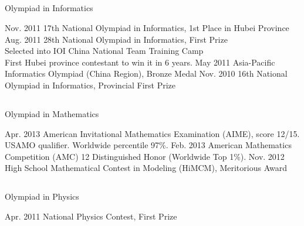 \documentclass[]{friggeri-cv} %
\begin{document}
\subsection{}{Olympiad in Informatics}
\begin{entrylist}
\centry
{Nov. 2011}
{17th National Olympiad in Informatics, 1st Place in Hubei Province}
\centry
{Aug. 2011}
{28th National Olympiad in Informatics, First Prize \\
Selected into IOI China National Team Training Camp \\
First Hubei province contestant to win it in 6 years. }
\centry
{May 2011}
{Asia-Pacific Informatics Olympiad (China Region), Bronze Medal}
\centry
{Nov. 2010}
{16th National Olympiad in Informatics, Provincial First Prize}
\end{entrylist}
\subsection{}{Olympiad in Mathematics}
\begin{entrylist}
\centry
{Apr. 2013}
{American Invitational Mathematics Examination (AIME), score 12/15. USAMO qualifier. Worldwide percentile 97\%. }
\centry
{Feb. 2013}
{American Mathematics Competition (AMC) 12 Distinguished Honor (Worldwide Top 1\%). }
\centry
{Nov. 2012}
{High School Mathematical Contest in Modeling (HiMCM), Meritorious Award}
\end{entrylist}
\subsection{}{Olympiad in Physics}
\begin{entrylist}
\centry
{Apr. 2011}
{National Physics Contest, First Prize}
\end{entrylist}


\end{document}
